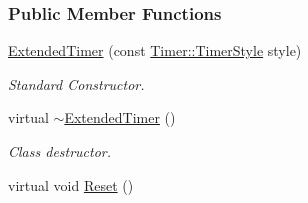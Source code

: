 \subsubsection*{Public Member Functions}
\begin{DoxyCompactItemize}
\item 
\hyperlink{classphys_1_1ExtendedTimer_a5dfd8368d6fa8b69ca8ab23b2d3ba69e}{ExtendedTimer} (const \hyperlink{classphys_1_1Timer_a1ee86bf43e20329d750c5d582dcce329}{Timer::TimerStyle} style)
\begin{DoxyCompactList}\small\item\em Standard Constructor. \item\end{DoxyCompactList}\item 
\hypertarget{classphys_1_1ExtendedTimer_a7a9ce42ffda17cbe366adde1688120af}{
virtual \hyperlink{classphys_1_1ExtendedTimer_a7a9ce42ffda17cbe366adde1688120af}{$\sim$ExtendedTimer} ()}
\label{dc/d7c/classphys_1_1ExtendedTimer_a7a9ce42ffda17cbe366adde1688120af}

\begin{DoxyCompactList}\small\item\em Class destructor. \item\end{DoxyCompactList}\item 
\hypertarget{classphys_1_1ExtendedTimer_a33f0cb87c37031ec54b99d09a522bafb}{
virtual void \hyperlink{classphys_1_1ExtendedTimer_a33f0cb87c37031ec54b99d09a522bafb}{Reset} ()}
\label{dc/d7c/classphys_1_1ExtendedTimer_a33f0cb87c37031ec54b99d09a522bafb}


\end{DoxyCompactItemize}
